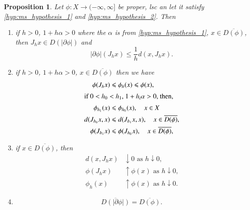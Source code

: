\documentclass[a4paper,11pt, leqno]{scrreprt} %
\renewcommand{\leq}{\leqslant}
\renewcommand{\leq}{\leqslant}
\theoremstyle{change}
\newcounter{acounter}[chapter]
\newtheorem{proposition}[acounter]{Proposition}
\theoremstyle{nonumberplain}
\begin{document}
\begin{proposition}
  Let $\phi : X \to (-\infty, \infty]$ be proper, lsc an let it
  satisfy \ref{hyp:ms_hypothesis_1} and
  \ref{hyp:ms_hypothesis_2}. Then
  \begin{enumerate}
  \item\label{item:ms_prop_1_1} if $h > 0$, $1 + h \alpha > 0$ where
    the $\alpha$ is from \ref{hyp:ms_hypothesis_1}, $x \in
    \overline{D(\phi)}$, then $J_h x \in D(|\partial \phi|)$ and
    \begin{equation}
      \label{eq:ms_prop_1_1}
      |\partial \phi|(J_h x) \leq \frac1h d(x, J_h x).
    \end{equation}
  \item\label{item:ms_prop_1_2} if $h > 0$, $1 + h\alpha > 0$, $x \in
    \overline{D(\phi)}$ then we have
    \begin{align}
      \label{eq:ms_prop_1_2}
      \phi(J_h x) &\leq \phi_h(x) \leq \phi(x),\\
      \shortintertext{if $0 < h_0 < h_1$, $1 + h_i \alpha > 0$, then,}
      \label{eq:ms_prop_1_3}
      \phi_{h_1}(x) &\leq \phi_{h_0}(x), \quad x \in X\\
      \label{eq:ms_prop_1_3_2}
      d(J_{h_0} x, x) &\leq d(J_{h_1}x, x), \quad x \in
      \overline{D(\phi)},\\
      \phi(J_{h_1} x) &\leq \phi(J_{h_0} x), \quad x \in \overline{D(\phi)},
    \end{align}
  \item\label{item:ms_prop_1_3} if $x \in \overline{D(\phi)}$, then
    \begin{align}
      \label{eq:ms_prop_1_4}
      d(x, J_h x) &\downarrow 0 \text{ as $h \downarrow 0$,}\\
      \label{eq:ms_prop_1_4_2}
      \phi(J_h x) &\uparrow \phi(x) \text{ as $h \downarrow 0$,}\\
      \label{eq:ms_prop_1_4_3}
      \phi_h(x) &\uparrow \phi(x) \text{ as $h \downarrow 0$.}
    \end{align}
  \item\label{item:ms_prop_1_4}
    \begin{equation}
      \label{eq:ms_prop_1_5}
      \overline{D(|\partial \phi|)} = \overline{D(\phi)}.
    \end{equation}
  \end{enumerate}
\end{proposition}
\end{document}
